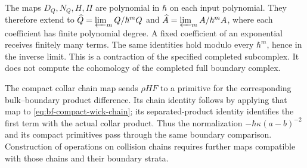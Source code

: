 The maps $D_Q,N_Q,H,\Pi$ are polynomial in $\hbar$ on each input
polynomial.  They therefore extend to $\widehat Q=\varprojlim_m Q/\hbar^mQ$
and $\widehat A=\varprojlim_m A/\hbar^mA$, where each
coefficient has finite polynomial degree.  A fixed coefficient of
an exponential receives finitely many terms.  The same identities
hold modulo every $\hbar^m$, hence in the inverse limit.
This is a contraction of the specified completed subcomplex.
It does not compute the cohomology of the completed full boundary complex.

The compact collar chain map sends
$\rho H F$ to a primitive for the corresponding bulk--boundary
product difference.  Its chain identity follows by applying that
map to \eqref{eq:bf-compact-wick-chain}; its separated-product identity
identifies the first term with the actual collar product.
Thus the normalization $-\hbar\kappa(a-b)^{-2}$ and its compact
primitives pass through the same boundary comparison.
Construction of operations on collision chains requires further
maps compatible with those chains and their boundary strata.
